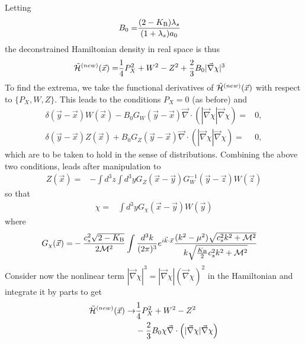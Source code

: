\documentclass[twocolumn,prd,preprintnumbers,amsmath,amssymb,nofootinbib,superscriptaddress]{revtex4-1}
\newcommand{\grad}{\ensuremath{\vec{\nabla}}}
\newcommand{\lambdas}{\lambda_s}
\newcommand{\Mcal}{{\cal M}}
\newcommand{\Hcal}{{\cal H}}
\newcommand{\KB}{\ensuremath{K_{{\rm B}}}}
\begin{document}
Letting
\begin{align}
B_0 =& \frac{(2-\KB)\lambdas}{ (1+\lambdas) a_0}
\end{align}
the deconstrained Hamiltonian density in real space is thus
\begin{align}
\tilde{\Hcal}^{(new)}(\vec{x}) =& \frac{1}{4} P_X^2 +  W^2 - Z^2 + \frac{2}{3} B_0 |\grad\chi|^3
\label{Ham_tilde_new}
\end{align}
To find the extrema, we take the functional derivatives of $\tilde{\Hcal}^{(new)}(\vec{x})$ with respect to $\{P_X, W, Z\}$. This leads to the conditions $P_X = 0$ (as before) and
\begin{align}
 \delta(\vec{y}-\vec{x}) W(\vec{x})   - B_0  G_W(\vec{y}-\vec{x}) \grad\cdot \left( |\grad\chi|\grad \chi \right) =&0,
\label{W_G_W}
\\
 \delta(\vec{y}-\vec{x}) Z(\vec{x})  +   B_0  G_Z(\vec{y}-\vec{x}) \grad\cdot \left(  |\grad\chi| \grad \chi \right) =&0,
\end{align}
which are to be taken to hold in the sense of distributions. 
Combining the above two conditions, leads after manipulation to
\begin{align}
 Z(\vec{x})  =& - \int d^3z \int d^3y   G_Z(\vec{x}-\vec{y}) G^{-1}_W(\vec{y}-\vec{z}) W(\vec{z})  
\end{align}
so that
\begin{align}
\chi  =& \int d^3y G_\chi(\vec{x}-\vec{y}) W(\vec{y})  
\end{align}
where
\begin{align}
G_\chi(\vec{x}) =&
-\frac{c_s^2\sqrt{2-\KB} }{2\Mcal^2}
\int \frac{d^3k}{(2\pi)^3}
 e^{i\vec{k}\cdot\vec{x} }   
\frac{ (k^2 - \mu^2) \sqrt{c_s^2 k^2 + \Mcal^2}}{k  \sqrt{\frac{\KB}{2}  c_s^2 k^2  +  \Mcal^2 }  }
\end{align} 
Consider now the nonlinear term $|\grad \chi|^3 = |\grad \chi| (\grad \chi)^2$ in the Hamiltonian and integrate it by parts to get
\begin{align}
\tilde{\Hcal}^{(new)}(\vec{x}) \rightarrow& \frac{1}{4} P_X^2 +  W^2 - Z^2 
\nonumber
\\
&
- \frac{2}{3} B_0 \chi \grad \cdot \left( |\grad\chi| \grad \chi\right)
\end{align}
\end{document}
